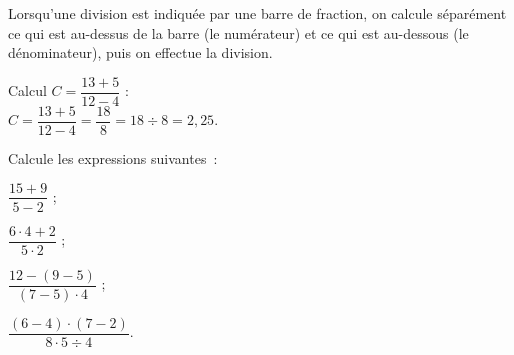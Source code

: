 \begin{methode*1}

\begin{aconnaitre}
Lorsqu’une division est indiquée par une barre de fraction, on calcule séparément ce qui est au-dessus de la barre (le numérateur) et ce qui est au-dessous (le dénominateur), puis on effectue la division.
\end{aconnaitre}

\begin{exemple*1}
Calcul $C = \dfrac{13 + 5}{12 - 4}$ : \\[1em]
$C = \dfrac{13 + 5}{12 - 4} = \dfrac{18}{8} = 18 \div 8 = 2,25$.
\end{exemple*1}


 \exercice 
Calcule les expressions suivantes :
\begin{colenumerate}{4}
\item $\dfrac{15 +9}{5 - 2}$ ;
\item $\dfrac{6 \cdot 4 + 2}{5 \cdot 2}$ ;
\item $\dfrac{12 - (9 - 5)}{(7- 5) \cdot 4}$ ;
\item $\dfrac{(6 - 4) \cdot (7 - 2)}{8 \cdot 5 \div 4}$.
 \end{colenumerate}

\end{methode*1}
